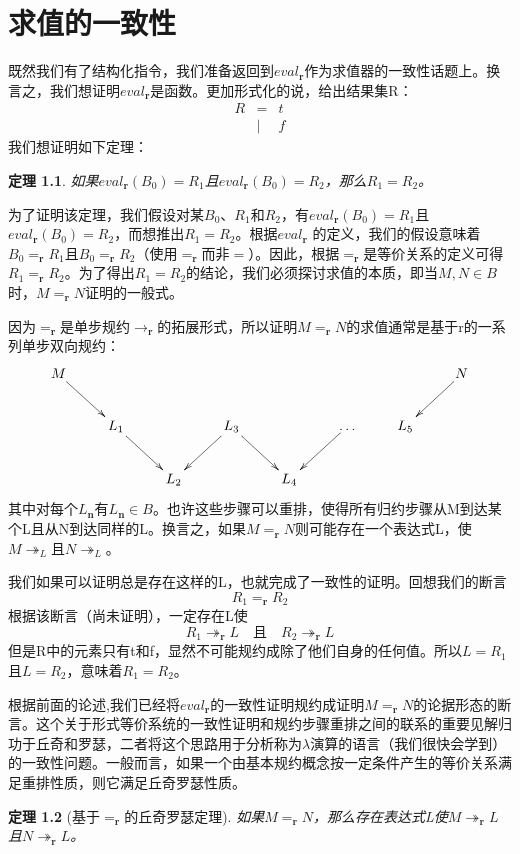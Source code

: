 \documentclass{book}
\def\r{\mathbf{r}}
\begin{document}
\chapter{求值的一致性}
既然我们有了结构化指令，我们准备返回到$eval_\r $作为求值器的一致性话题上。换言之，我们想证明$eval_\r $是函数。更加形式化的说，给出结果集R：
$$
\begin{array}{ccc}
R&=&t\\
&|&f
\end{array}
$$
我们想证明如下定理：
\newtheorem{Theorem}{定理}[chapter]
\newtheorem{Lemma}[Theorem]{引理}
\begin{Theorem}
如果$eval_\r (B_0)=R_1$且$eval_\r (B_0)=R_2$，那么$R_1=R_2$。
\end{Theorem}
为了证明该定理，我们假设对某$B_0$、$R_1$和$R_2$，有$eval_\r (B_0)=R_1$且$eval_\r (B_0)=R_2$，而想推出$R_1=R_2$。根据$eval_\r $ 的定义，我们的假设意味着$B_0=_\r R_1$且$B_0=_\r R_2$（使用$=_\r $而非$=$）。因此，根据$=_\r $是等价关系的定义可得$R_1=_\r R_2$。为了得出$R_1=R_2$的结论，我们必须探讨求值的本质，即当$M,N\in B$时，$M=_\r N$证明的一般式。\par
因为$=_\r $是单步规约$\rightarrow_\r $的拓展形式，所以证明$M=_\r N$的求值通常是基于r的一系列单步双向规约：\\
$$
\xymatrix{
  {M} \ar[rd] & & & & & & & {N} \ar[ld] \\
    & {L_1} \ar[rd] & & {L_3} \ar[ld] \ar[rd] & & {\ldots}\ar[ld] &{ L_5}\\
    & & {L_2} & & {L_4} 
}
$$
其中对每个$L_\textbf{n}$有$L_\textbf{n}\in B$。也许这些步骤可以重排，使得所有归约步骤从M到达某个L且从N到达同样的L。换言之，如果$M=_\r N$则可能存在一个表达式L，使$M\twoheadrightarrow_L$且$N\twoheadrightarrow_L$。\par
我们如果可以证明总是存在这样的L，也就完成了一致性的证明。回想我们的断言
$$ R_1=_\r R_2$$
根据该断言（尚未证明），一定存在L使
$$R_1\twoheadrightarrow_\r L\quad \text{且}\quad R_2\twoheadrightarrow_\r L$$
但是R中的元素只有t和f，显然不可能规约成除了他们自身的任何值。所以$L=R_1$且$L=R_2$，意味着$R_1=R_2$。\par
根据前面的论述,我们已经将$eval_\r $的一致性证明规约成证明$M=_\r N$的论据形态的断言。这个关于形式等价系统的一致性证明和规约步骤重排之间的联系的重要见解归功于丘奇和罗瑟，二者将这个思路用于分析称为$\lambda$演算的语言（我们很快会学到）的一致性问题。一般而言，如果一个由基本规约概念按一定条件产生的等价关系满足重排性质，则它满足丘奇罗瑟性质。
\begin{Theorem}[基于$=_\r $的丘奇罗瑟定理]
如果$M=_\r N$，那么存在表达式L使$M\twoheadrightarrow_\r L$且$N\twoheadrightarrow_\r L$。
\end{Theorem}
\end{document}
